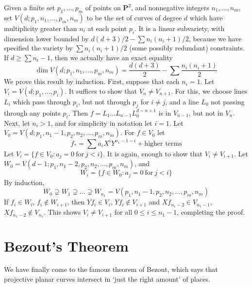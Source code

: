 Given a finite set $p_1, \dots, p_m$ of points on $\mathbf{P}^2$, and nonnegative integers $n_1, \dots, n_m$, set $V(d;p_1,n_1,\dots,p_m,n_m)$ to be the set of curves of degree $d$ which have multiplicity greater than $n_i$ at each point $p_i$. It is a linear subvariety, with dimension lower bounded by $d(d+3)/2 - \sum n_i(n_i + 1)/2$, because we have specified the variety by $\sum n_i(n_i + 1)/2$ (some possibly redundant) constraints. If $d \geq \sum n_i - 1$, then we actually have an exact equality
%
\[ \dim V(d;p_1,n_1,\dots,p_m,n_m) = \frac{d(d+3)}{2} - \sum \frac{n_i(n_i + 1)}{2} \]
%
We prove this result by induction. First, suppose that each $n_i = 1$. Let $V_i = V(d;p_1,\dots,p_i)$. It suffices to show that $V_n \neq V_{n+1}$. For this, we choose lines $L_i$ which pass through $p_i$, but not through $p_j$ for $i \neq j$, and a line $L_0$ not passing through any points $p_i$. Then $f = L_1 \dots L_{n-1}L_0^{d-n+1}$ is in $V_{n-1}$, but not in $V_n$. Next, let $n_i > 1$, and for simplicity in notation let $i = 1$. Let $V_0 = V(d;p_1,n_1-1,p_2,n_2, \dots,p_m,n_m)$. For $f \in V_0$ let
%
\[ f_* = \sum a_iX^iY^{n_1-1-i} + \text{higher terms} \]
%
Let $V_i = \{ f \in V_0: a_j = 0\ \text{for}\ j < i \}$. It is again, enough to show that $V_i \neq V_{i+1}$. Let $W_0 = V(d-1;p_1,n_1-2,p_2,n_2, \dots, p_m,n_m)$, and
%
\[ W_i = \{ f \in W_0: a_j = 0\ \text{for}\ j < i \} \]
%
By induction,
%
\[ W_0 \supsetneq W_1 \supsetneq \dots \supsetneq W_{n_1} = V(p_1,n_1-1,p_2,n_2, \dots,p_m,n_m) \]
%
If $f_i \in W_i$, $f_i \not \in W_{i+1}$, then $Yf_i \in V_i$, $Yf_i \not \in V_{i+1}$ and $Xf_{n_1-2} \in V_{n_1-1}$, $Xf_{n_1-2} \not \in V_{n_1}$. This shows $V_i \neq V_{i+1}$ for all $0 \leq i \leq n_1 - 1$, completing the proof.

\section{Bezout's Theorem}

We have finally come to the famous theorem of Bezout, which says that projective planar curves intersect in `just the right amount' of places.

